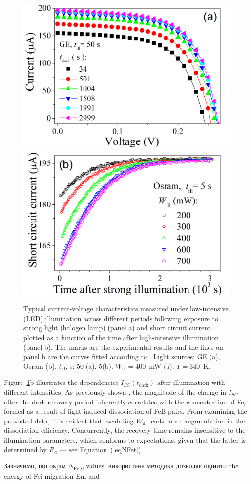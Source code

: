\documentclass{WileyMSP-template}
\begin{document}
\begin{figure}
\centering
  \includegraphics[width=0.4\linewidth]{Fig2a.png}
  \includegraphics[width=0.4\linewidth]{Fig2b.png}
  \caption{Typical current-voltage characteristics measured
  under low-intensive (LED) illumination across different periods following exposure to strong light (halogen lamp) (panel a) and
  short circuit current plotted as a function of the time after high-intensive illumination (panel b).
  The marks are the experimental results and the lines on panel b are the curves fitted according to \cite{Olikh2022:JMatSci,Olikh2021JAP}.
  Light sources: GE (a), Osram (b).
  $t_\mathrm{ill}$, s: 50 (a), 5(b).
  $W_\mathrm{ill}=400$~mW (a).
  $T=340$~K.}
  \label{fig2}
\end{figure}

Figure~\ref{fig2}b illustrates the dependencies $I_{SC}(t_\mathrm{dark})$ after illumination with different intensities. 
As previously shown \cite{Olikh2021JAP}, the magnitude of the change in $I_{SC}$ after the dark recovery period 
inherently correlates with the concentration of Fe$_i$ formed as a result of light-induced dissociation of FeB pairs. 
From examining the presented data, it is evident that escalating $W_\mathrm{ill}$ leads to an augmentation in the dissociation efficiency. 
Concurrently, the recovery time remains insensitive to the illumination parameters, which conforms to expectations, 
given that the latter is determined by $R_a$ --- see Equation~(\ref{eqNFet}).

Зазначимо, що окрім $N_\mathrm{Fe,0}$ values, використана методика дозволяє оцінити the energy of Fei migration Em and
\end{document}
